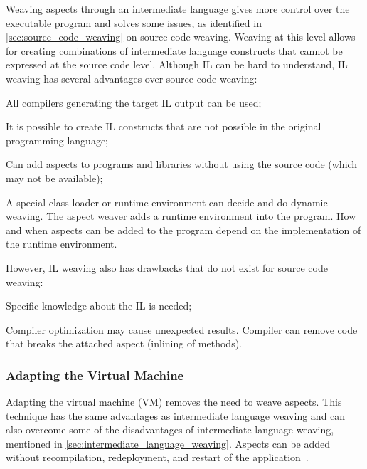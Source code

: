 Weaving aspects through an intermediate language gives more control over the executable program and solves some issues, as identified in \autoref{sec:source_code_weaving} on source code weaving.
Weaving at this level allows for creating combinations of intermediate language constructs that cannot be expressed at the source code level.
Although IL can be hard to understand, IL weaving has several advantages over source code weaving:
\begin{description}[style=nextline,noitemsep]
  \item[Programming language independence] All compilers generating the target IL output can be used;
  \item[More expressiveness] It is possible to create IL constructs that are not possible in the original programming language;
  \item[Source code independence] Can add aspects to programs and libraries without using the source code (which may not be available);
  \item[Adding aspects at load- or runtime] A special class loader or runtime environment can decide and do dynamic weaving.
       The aspect weaver adds a runtime environment into the program.
       How and when aspects can be added to the program depend on the implementation of the runtime environment.
\end{description}

However, IL weaving also has drawbacks that do not exist for source code weaving:
\begin{description}[style=nextline,noitemsep]
  \item[Hard to understand] Specific knowledge about the IL is needed;
  \item[More error-prone] Compiler optimization may cause unexpected results.
       Compiler can remove code that breaks the attached aspect (\eg inlining of methods).
\end{description}

\subsubsection{Adapting the Virtual Machine}

%
Adapting the virtual machine (VM) removes the need to weave aspects.
This technique has the same advantages as intermediate language weaving and can also overcome some of the disadvantages of intermediate language weaving, mentioned in \autoref{sec:intermediate_language_weaving}.
Aspects can be added without recompilation, redeployment, and restart of the application~\cite{popovici:aosd02,popovici:aosd03}.

